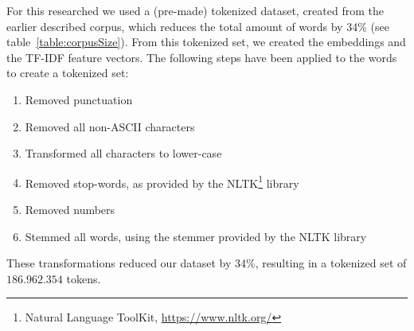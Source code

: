 \documentclass[../../Thesis.tex]{subfiles}
\begin{document}
\FloatBarrier
{}
For this researched we used a (pre-made) tokenized dataset, created from the earlier described corpus, which reduces the total amount of words by 34\% (see table~\ref{table:corpusSize}). From this tokenized set, we created the embeddings and the TF-IDF feature vectors.
The following steps have been applied to the words to create a tokenized set:
\begin{enumerate}
\item{Removed punctuation}
\item{Removed all non-ASCII characters}
\item{Transformed all characters to lower-case}
\item{Removed stop-words, as provided by the NLTK\footnote{Natural Language ToolKit, \url{https://www.nltk.org/}} library}
\item{Removed numbers}
\item{Stemmed all words, using the stemmer provided by the NLTK library}
\end{enumerate}
These transformations reduced our dataset by 34\%, resulting in a tokenized set of $186.962.354$ tokens.
\end{document}
